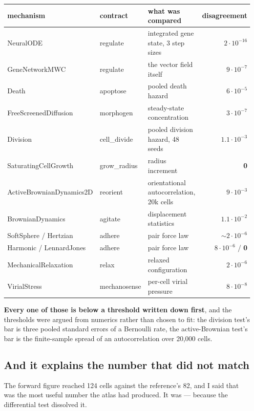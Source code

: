 \documentclass[11pt,a4paper]{article}
\begin{document}
\begin{center}
\footnotesize
\begin{tabular}{@{}l l l r@{}}
\toprule
\textbf{mechanism} & \textbf{contract} & \textbf{what was compared} & \textbf{disagreement}\\
\midrule
NeuralODE & regulate & integrated gene state, 3 step sizes & $2{\cdot}10^{-16}$\\
GeneNetworkMWC & regulate & the vector field itself & $9{\cdot}10^{-7}$\\
Death & apoptose & pooled death hazard & $6{\cdot}10^{-5}$\\
FreeScreenedDiffusion & morphogen & steady-state concentration & $3{\cdot}10^{-7}$\\
Division & cell\_divide & pooled division hazard, 48 seeds & $1.1{\cdot}10^{-3}$\\
SaturatingCellGrowth & grow\_radius & radius increment & \textbf{0}\\
ActiveBrownianDynamics2D & reorient & orientational autocorrelation, 20k cells & $9{\cdot}10^{-3}$\\
BrownianDynamics & agitate & displacement statistics & $1.1{\cdot}10^{-2}$\\
SoftSphere / Hertzian & adhere & pair force law & $\sim\!2{\cdot}10^{-6}$\\
Harmonic / LennardJones & adhere & pair force law & $8{\cdot}10^{-6}$ / \textbf{0}\\
MechanicalRelaxation & relax & relaxed configuration & $2{\cdot}10^{-6}$\\
VirialStress & mechanosense & per-cell virial pressure & $8{\cdot}10^{-8}$\\
\bottomrule
\end{tabular}
\end{center}

\textbf{Every one of those is below a threshold written down first}, and the thresholds were
argued from numerics rather than chosen to fit: the division test's bar is three pooled standard
errors of a Bernoulli rate, the active-Brownian test's bar is the finite-sample spread of an
autocorrelation over 20{,}000 cells.

\subsection{And it explains the number that did not match}

The forward figure reached 124 cells against the reference's 82, and I said that was the most
useful number the atlas had produced. It was --- because the differential test dissolved it.
\end{document}
